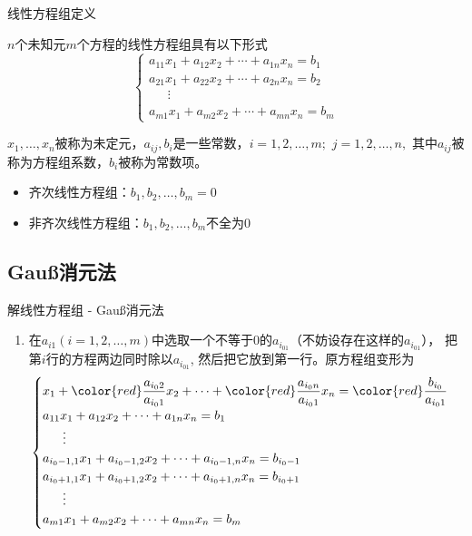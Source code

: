 \begin{frame}{线性方程组定义}

$n$个未知元$m$个方程的线性方程组具有以下形式
$$
\begin{cases}
a_{11}x_1 + a_{12}x_2 + \cdots + a_{1n}x_n = b_1 \\
a_{21}x_1 + a_{22}x_2 + \cdots + a_{2n}x_n = b_2 \\
\phantom{yyy} \vdots \\
a_{m1}x_1 + a_{m2}x_2 + \cdots + a_{mn}x_n = b_m
\end{cases}$$

\pause

$x_1,\ldots,x_n$被称为未定元，$a_{ij},b_i$是一些常数，$i=1,2,\ldots,m;$ $j = 1,2,\ldots,n,$ 其中$a_{ij}$被称为方程组系数，$b_i$被称为常数项。

\pause

\begin{itemize}
\item 齐次线性方程组：$b_1,b_2,\ldots,b_m = 0$
\item 非齐次线性方程组：$b_1,b_2,\ldots,b_m$不全为$0$
\end{itemize}

\end{frame}


\subsection{Gau{\ss}消元法}


\begin{frame}{解线性方程组 - Gau{\ss}消元法}

\begin{enumerate}
\item 在$a_{i1} (i=1,2,\ldots,m)$中选取一个不等于$0$的$a_{i_01}$（不妨设存在这样的$a_{i_01}$）， 把第$i$行的方程两边同时除以$a_{i_01}$, 然后把它放到第一行。原方程组变形为
$$
\begin{cases}
x_1 + {\color{red} \dfrac{a_{i_02}}{a_{i_01}}}x_2 + \cdots + {\color{red} \dfrac{a_{i_0n}}{a_{i_01}}}x_n = {\color{red} \dfrac{b_{i_0}}{a_{i_01}}} \\
a_{11}x_1 + a_{12}x_2 + \cdots + a_{1n}x_n = b_1 \\
\phantom{yyy} \vdots \\
a_{i_0-1,1}x_1 + a_{i_0-1,2}x_2 + \cdots + a_{i_0-1,n}x_n = b_{i_0-1} \\
a_{i_0+1,1}x_1 + a_{i_0+1,2}x_2 + \cdots + a_{i_0+1,n}x_n = b_{i_0+1} \\
\phantom{yyy} \vdots \\
a_{m1}x_1 + a_{m2}x_2 + \cdots + a_{mn}x_n = b_m
\end{cases}$$
\end{enumerate}

\end{frame}

